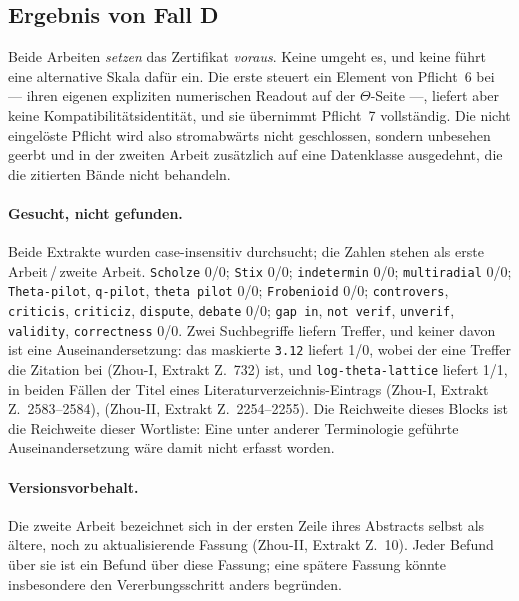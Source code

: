 \documentclass[11pt,a4paper]{article}
\theoremstyle{definition}
\newcommand{\anchor}[2]{(#1, Extrakt Z.~#2)}
\begin{document}
\subsection{Ergebnis von Fall D}

Beide Arbeiten \emph{setzen} das Zertifikat \emph{voraus}. Keine umgeht es, und
keine führt eine alternative Skala dafür ein. Die erste steuert ein Element von
Pflicht~6 bei --- ihren eigenen expliziten numerischen Readout auf der
$\Theta$-Seite ---, liefert aber keine Kompatibilitätsidentität, und sie
übernimmt Pflicht~7 vollständig. Die nicht eingelöste Pflicht wird also
stromabwärts nicht geschlossen, sondern unbesehen geerbt und in der zweiten Arbeit
zusätzlich auf eine Datenklasse ausgedehnt, die die zitierten Bände nicht
behandeln.

\paragraph{Gesucht, nicht gefunden.} Beide Extrakte wurden case-insensitiv
durchsucht; die Zahlen stehen als erste Arbeit\,/\,zweite Arbeit.
\texttt{Scholze} 0/0; \texttt{Stix} 0/0; \texttt{indetermin} 0/0;
\texttt{multiradial} 0/0; \texttt{Theta-pilot}, \texttt{q-pilot},
\texttt{theta pilot} 0/0; \texttt{Frobenioid} 0/0; \texttt{controvers},
\texttt{criticis}, \texttt{criticiz}, \texttt{dispute}, \texttt{debate} 0/0;
\texttt{gap in}, \texttt{not verif}, \texttt{unverif}, \texttt{validity},
\texttt{correctness} 0/0. Zwei Suchbegriffe liefern Treffer, und keiner davon ist
eine Auseinandersetzung: das maskierte \texttt{3.12} liefert 1/0, wobei der eine
Treffer die Zitation bei \anchor{Zhou-I}{732} ist, und \texttt{log-theta-lattice}
liefert 1/1, in beiden Fällen der Titel eines Literaturverzeichnis-Eintrags
\anchor{Zhou-I}{2583--2584}, \anchor{Zhou-II}{2254--2255}. Die Reichweite dieses
Blocks ist die Reichweite dieser Wortliste: Eine unter anderer Terminologie
geführte Auseinandersetzung wäre damit nicht erfasst worden.

\paragraph{Versionsvorbehalt.} Die zweite Arbeit bezeichnet sich in der ersten
Zeile ihres Abstracts selbst als ältere, noch zu aktualisierende Fassung
\anchor{Zhou-II}{10}. Jeder Befund über sie ist ein Befund über diese Fassung;
eine spätere Fassung könnte insbesondere den Vererbungsschritt anders begründen.

\end{document}
